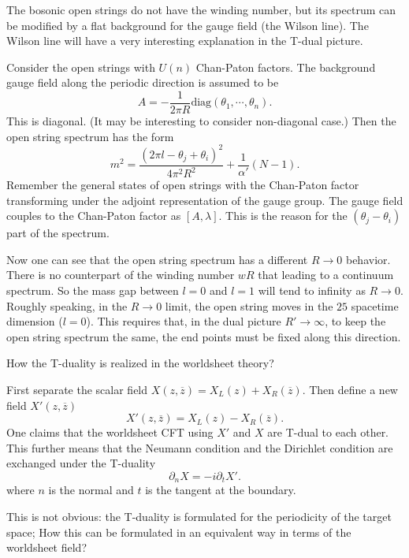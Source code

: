 The bosonic open strings do not have the winding number,
but its spectrum can be modified by a flat background for the gauge field
(the Wilson line).
The Wilson line will have a very interesting explanation in the T-dual picture.

Consider the open strings with $U(n)$ Chan-Paton factors.
The background gauge field along the periodic direction is assumed to be
\[
A = - \frac{1}{2 \pi R} \mathrm{diag} (\theta_1,\cdots,\theta_n)
.\] 
This is diagonal.
(It may be interesting to consider non-diagonal case.)
Then the open string spectrum has the form
\begin{equation}
m^2 = \frac{(2 \pi l - \theta_j + \theta_i)^2}{4 \pi^2 R^2}
+ \frac{1}{\alpha'} (N-1).
\end{equation}
Remember the general states of open strings with the Chan-Paton factor
transforming under the adjoint representation of the gauge group.
The gauge field couples to the Chan-Paton factor as $[A,\lambda]$.
This is the reason for the $(\theta_j-\theta_i)$ part of the spectrum.

Now one can see that
the open string spectrum has a different $R\to 0$ behavior.
There is no counterpart of the winding number $wR$
that leading to a continuum spectrum.
So the mass gap between $l=0$ and $l=1$ will tend to infinity
as $R\to 0$.
Roughly speaking, in the $R\to 0$ limit,
the open string moves in the $25$ spacetime dimension ($l=0$).
This requires that, in the dual picture $R'\to\infty$,
to keep the open string spectrum the same,
the end points must be fixed along this direction.


\begin{problem}[T-duality]
How the T-duality is realized in the worldsheet theory?	
\end{problem}

First separate the scalar field $X(z,\overline{z}) = X_L(z) + X_R(\overline{z})$.
Then define a new field $X'(z,\overline{z})$
\[
X'(z,\overline{z}) = X_L(z) - X_R(\overline{z})
.\] 
One claims that the worldsheet CFT using $X'$ and $X$
are T-dual to each other.
This further means that
the Neumann condition and the Dirichlet condition
are exchanged under the T-duality
\[
\partial_n X = - i \partial_t X'
.\] 
where $n$ is the normal and $t$ is the tangent at the boundary.

\begin{question}
This is not obvious: the T-duality is formulated for the periodicity of the target space;
How this can be formulated in an equivalent way in terms of the worldsheet field?
\end{question}

